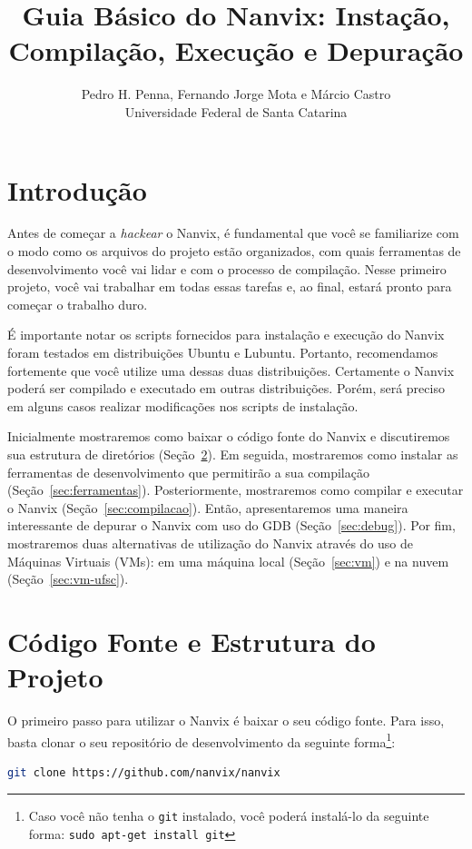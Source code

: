 \documentclass[11pt]{article}
\title{Guia Básico do Nanvix: Instação, Compilação, Execução e Depuração}
\author{Pedro H. Penna, Fernando Jorge Mota e Márcio Castro\\[0.3em]
\small Universidade Federal de Santa Catarina}
\date{}
\begin{document}
\maketitle

\section{Introdução}

Antes de começar a \textit{hackear} o Nanvix, é fundamental que você se familiarize com o modo como os arquivos do projeto estão organizados, com quais ferramentas de desenvolvimento você vai lidar e com o processo de compilação. Nesse primeiro projeto, você vai trabalhar em todas essas tarefas e, ao final, estará pronto para começar o trabalho duro.

É importante notar os scripts fornecidos para instalação e execução do Nanvix foram testados em distribuições Ubuntu e Lubuntu. Portanto, recomendamos fortemente que você utilize uma dessas duas distribuições. Certamente o Nanvix poderá ser compilado e executado em outras distribuições. Porém, será preciso em alguns casos realizar modificações nos scripts de instalação. 

Inicialmente mostraremos como baixar o código fonte do Nanvix e discutiremos sua estrutura de diretórios (Seção~\ref{sec:codigo}). Em seguida, mostraremos como instalar as ferramentas de desenvolvimento que permitirão a sua compilação (Seção~\ref{sec:ferramentas}). Posteriormente, mostraremos como compilar e executar o Nanvix (Seção~\ref{sec:compilacao}). Então, apresentaremos uma maneira interessante de depurar o Nanvix com uso do GDB (Seção~\ref{sec:debug}). Por fim, mostraremos duas alternativas de utilização do Nanvix através do uso de Máquinas Virtuais (VMs): em uma máquina local (Seção~\ref{sec:vm}) e na nuvem (Seção~\ref{sec:vm-ufsc}).

\section{Código Fonte e Estrutura do Projeto}
\label{sec:codigo}
O primeiro passo para utilizar o Nanvix é baixar o seu código fonte. Para isso, basta clonar o seu repositório de desenvolvimento da seguinte forma\footnote{Caso você não tenha o \texttt{git} instalado, você poderá instalá-lo da seguinte forma: \texttt{sudo apt-get install git}}:\\

\begin{lstlisting}[language=bash,numbers=none,frame=single]
git clone https://github.com/nanvix/nanvix
\end{lstlisting}
\end{document}
